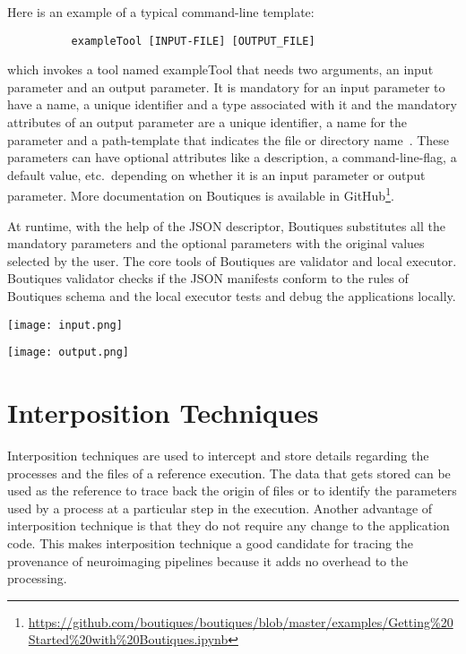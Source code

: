 
Here is an example of a typical command-line template:

\begin{verbatim}
          exampleTool [INPUT-FILE] [OUTPUT_FILE]
\end{verbatim}

\noindent which invokes a tool named exampleTool that needs two arguments, an input parameter and an output parameter. It is mandatory for an input parameter to have a name, a unique identifier and a type associated with it and the mandatory attributes of an output parameter are a unique identifier, a name for the parameter and a path-template that indicates the file or directory name~\cite{boutiques}. These parameters can have optional attributes like a description, a command-line-flag, a default value, etc.\ depending on whether it is an input parameter or output parameter. More documentation on Boutiques is available in GitHub\footnote{\url{https://github.com/boutiques/boutiques/blob/master/examples/Getting\%20Started\%20with\%20Boutiques.ipynb}}.

At runtime, with the help of the JSON descriptor, Boutiques substitutes all the mandatory parameters and the optional parameters with the original values selected by the user. The core tools of Boutiques are validator and local executor. Boutiques validator checks if the JSON manifests conform to the rules of Boutiques schema and the local executor tests and debug the applications locally.

\begin{center}
\texttt{[image: input.png]}
\label{fig:input}
\end{center}

\begin{center}
\texttt{[image: output.png]}
\label{fig:output}
\end{center}

\section{Interposition Techniques}\label{Interposition}
Interposition techniques are used to intercept and store details regarding the processes and the files of a reference execution. 
The data that gets stored can be used as the reference to trace back the origin of files or to identify the parameters used by a process at a particular step in the execution. 
Another advantage of interposition technique is that they do not require any change to the application code. 
This makes interposition technique a good candidate for tracing the provenance of neuroimaging pipelines because it adds no overhead to the processing.

